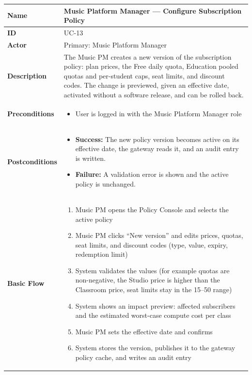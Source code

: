 \documentclass[a4paper]{article}
\newlength{\ucLeft}
\begin{document}
\begin{longtable}{|>{\bfseries}p{\ucLeft}|p{\dimexpr\linewidth-\ucLeft-2\tabcolsep-2\arrayrulewidth}|}
\hline
Name & Music Platform Manager --- Configure Subscription Policy \\ \hline
ID & UC-13 \\ \hline
Actor & Primary: Music Platform Manager \\ \hline
Description & The Music PM creates a new version of the subscription policy: plan prices, the Free daily quota, Education pooled quotas and per-student caps, seat limits, and discount codes. The change is previewed, given an effective date, activated without a software release, and can be rolled back. \\ \hline
Preconditions &
\begin{itemize}[leftmargin=1em, nosep, topsep=2pt, partopsep=0pt, parsep=0pt, after=\strut]
    \item User is logged in with the Music Platform Manager role
\end{itemize}
\\ \hline
Postconditions &
\begin{itemize}[leftmargin=1em, nosep, topsep=2pt, partopsep=0pt, parsep=0pt, after=\strut]
    \item \textbf{Success:} The new policy version becomes active on its effective date, the gateway reads it, and an audit entry is written.
    \item \textbf{Failure:} A validation error is shown and the active policy is unchanged.
\end{itemize}
\\ \hline
Basic Flow &
\begin{enumerate}[leftmargin=1.5em, nosep, topsep=2pt, partopsep=0pt, parsep=0pt, after=\strut]
    \item Music PM opens the Policy Console and selects the active policy
    \item Music PM clicks ``New version'' and edits prices, quotas, seat limits, and discount codes (type, value, expiry, redemption limit)
    \item System validates the values (for example quotas are non-negative, the Studio price is higher than the Classroom price, seat limits stay in the 15--50 range)
    \item System shows an impact preview: affected subscribers and the estimated worst-case compute cost per class
    \item Music PM sets the effective date and confirms
    \item System stores the version, publishes it to the gateway policy cache, and writes an audit entry

\end{enumerate}
\end{longtable}
\end{document}
